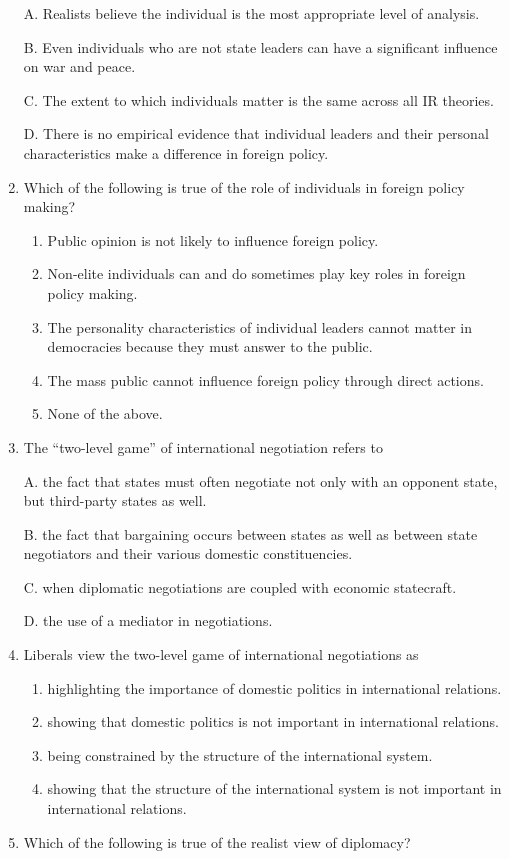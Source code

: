 \documentclass[
]{book}
\begin{document}
\begin{enumerate}
  A. Realists believe the individual is the most appropriate level of analysis.

  B. Even individuals who are not state leaders can have a significant influence on war and peace.

  C. The extent to which individuals matter is the same across all IR theories.

  D. There is no empirical evidence that individual leaders and their personal characteristics make a difference in foreign policy.
\item
  Which of the following is true of the role of individuals in foreign policy making?

  \begin{enumerate}
  \def\labelenumii{\Alph{enumii}.}
  \item
    Public opinion is not likely to influence foreign policy.
  \item
    Non-elite individuals can and do sometimes play key roles in foreign policy making.
  \item
    The personality characteristics of individual leaders cannot matter in democracies because they must answer to the public.
  \item
    The mass public cannot influence foreign policy through direct actions.
  \item
    None of the above.
  \end{enumerate}
\item
  The ``two-level game'' of international negotiation refers to

  A. the fact that states must often negotiate not only with an opponent state, but third-party states as well.

  B. the fact that bargaining occurs between states as well as between state negotiators and their various domestic constituencies.

  C. when diplomatic negotiations are coupled with economic statecraft.

  D. the use of a mediator in negotiations.
\item
  Liberals view the two-level game of international negotiations as

  \begin{enumerate}
  \def\labelenumii{\Alph{enumii}.}
  \item
    highlighting the importance of domestic politics in international relations.
  \item
    showing that domestic politics is not important in international relations.
  \item
    being constrained by the structure of the international system.
  \item
    showing that the structure of the international system is not important in international relations.
  \end{enumerate}
\item
  Which of the following is true of the realist view of diplomacy?


\end{enumerate}
\end{document}
